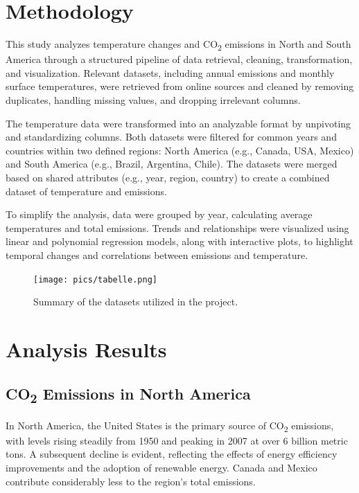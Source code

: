 \documentclass[a4paper,11pt]{article}
\begin{document}
\section{Methodology}
This study analyzes temperature changes and CO\textsubscript{2} emissions in North and South America through a structured pipeline of data retrieval, cleaning, transformation, and visualization. Relevant datasets, including annual emissions and monthly surface temperatures, were retrieved from online sources and cleaned by removing duplicates, handling missing values, and dropping irrelevant columns.

\noindent
The temperature data were transformed into an analyzable format by unpivoting and standardizing columns. Both datasets were filtered for common years and countries within two defined regions: North America (e.g., Canada, USA, Mexico) and South America (e.g., Brazil, Argentina, Chile). The datasets were merged based on shared attributes (e.g., year, region, country) to create a combined dataset of temperature and emissions.

\noindent
To simplify the analysis, data were grouped by year, calculating average temperatures and total emissions. Trends and relationships were visualized using linear and polynomial regression models, along with interactive plots, to highlight temporal changes and correlations between emissions and temperature.

\begin{figure}[htbp]
    \centering
    \texttt{[image: pics/tabelle.png]} 
    \caption{Summary of the datasets utilized in the project.}
    \label{fig:dataset-overview}
\end{figure}

\section{Analysis Results}

\subsection{CO\textsubscript{2} Emissions in North America}
In North America, the United States is the primary source of CO\textsubscript{2} emissions, with levels rising steadily from 1950 and peaking in 2007 at over 6 billion metric tons. A subsequent decline is evident, reflecting the effects of energy efficiency improvements and the adoption of renewable energy. Canada and Mexico contribute considerably less to the region’s total emissions.
\end{document}
